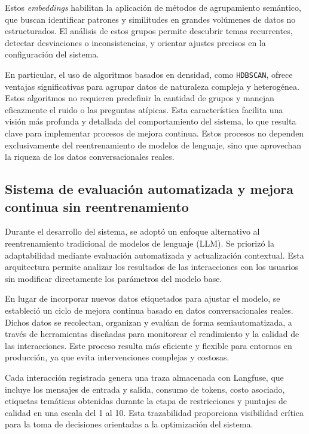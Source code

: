     Estos \textit{embeddings} habilitan la aplicación de métodos de agrupamiento semántico, que buscan identificar patrones y similitudes en grandes volúmenes de datos no estructurados. El análisis de estos grupos permite descubrir temas recurrentes, detectar desviaciones o inconsistencias, y orientar ajustes precisos en la configuración del sistema.

    En particular, el uso de algoritmos basados en densidad, como \texttt{HDBSCAN}, ofrece ventajas significativas para agrupar datos de naturaleza compleja y heterogénea. Estos algoritmos no requieren predefinir la cantidad de grupos y manejan eficazmente el ruido o las preguntas atípicas. Esta característica facilita una visión más profunda y detallada del comportamiento del sistema, lo que resulta clave para implementar procesos de mejora continua. Estos procesos no dependen exclusivamente del reentrenamiento de modelos de lenguaje, sino que aprovechan la riqueza de los datos conversacionales reales.
 
\subsection{Sistema de evaluación automatizada y mejora continua sin reentrenamiento}

Durante el desarrollo del sistema, se adoptó un enfoque alternativo al reentrenamiento tradicional de modelos de lenguaje (LLM). Se priorizó la adaptabilidad mediante evaluación automatizada y actualización contextual. Esta arquitectura permite analizar los resultados de las interacciones con los usuarios sin modificar directamente los parámetros del modelo base.

En lugar de incorporar nuevos datos etiquetados para ajustar el modelo, se estableció un ciclo de mejora continua basado en datos conversacionales reales. Dichos datos se recolectan, organizan y evalúan de forma semiautomatizada, a través de herramientas diseñadas para monitorear el rendimiento y la calidad de las interacciones. Este proceso resulta más eficiente y flexible para entornos en producción, ya que evita intervenciones complejas y costosas.

Cada interacción registrada genera una traza almacenada con Langfuse, que incluye los mensajes de entrada y salida, consumo de tokens, costo asociado, etiquetas temáticas obtenidas durante la etapa de restricciones y puntajes de calidad en una escala del 1 al 10. Esta trazabilidad proporciona visibilidad crítica para la toma de decisiones orientadas a la optimización del sistema.

